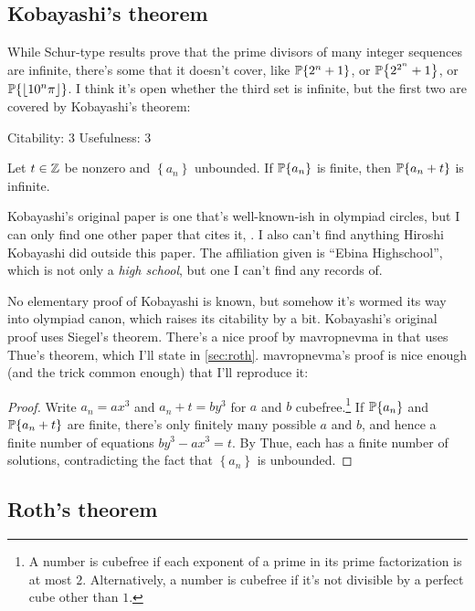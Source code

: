 \documentclass[11pt,paper=letter]{scrartcl}
\newcommand{\seq}[1]{\left\{#1\right\}}
\newcommand{\primeseq}[1]{\PP\!\seq{#1}}
\newcommand{\thmrating}[3]{\begin{center}\sffamily%
\bluebf{#1.} \hfill Citability: #2 \qquad Usefulness: #3%
\vspace{0.3em}\end{center}\noindent\!\!}
\begin{document}
\subsection{Kobayashi's theorem}

While Schur-type results prove that the prime divisors of many integer sequences are infinite, there's some that it doesn't cover, like $\primeseq{2^n + 1}$, or $\primeseq{2^{2^n} + 1}$, or $\primeseq{\floor{10^n \pi}}$. I think it's open whether the third set is infinite, but the first two are covered by Kobayashi's theorem:

\begin{thmboxed*}
\thmrating{Kobayashi's theorem}{3}{3}
Let $t \in \mathbb Z$ be nonzero and $\seq{a_n}$ unbounded. If $\primeseq{a_n}$ is finite, then $\primeseq{a_n + t}$ is infinite.
\end{thmboxed*}

Kobayashi's original paper \cite{kobayashi81} is one that's well-known-ish in olympiad circles, but I can only find one other paper that cites it, \cite{morton90}. I also can't find anything Hiroshi Kobayashi did outside this paper. The affiliation given is ``Ebina Highschool'', which is not only a \textit{high school}, but one I can't find any records of.

No elementary proof of Kobayashi is known, but somehow it's wormed its way into olympiad canon, which raises its citability by a bit. Kobayashi's original proof uses Siegel's theorem. There's a nice proof by mavropnevma in \cite{schwarz11} that uses Thue's theorem, which I'll state in \autoref{sec:roth}. mavropnevma's proof is nice enough (and the trick common enough) that I'll reproduce it:

\begin{proof}
Write $a_n = ax^3$ and $a_n + t = by^3$ for $a$ and $b$ cubefree.\footnote{A number is cubefree if each exponent of a prime in its prime factorization is at most $2$. Alternatively, a number is cubefree if it's not divisible by a perfect cube other than $1$.} If $\primeseq{a_n}$ and $\primeseq{a_n + t}$ are finite, there's only finitely many possible $a$ and $b$, and hence a finite number of equations $by^3 - ax^3 = t$. By Thue, each has a finite number of solutions, contradicting the fact that $\seq{a_n}$ is unbounded.
\end{proof}

\subsection{Roth's theorem}
\label{sec:roth}
\end{document}
